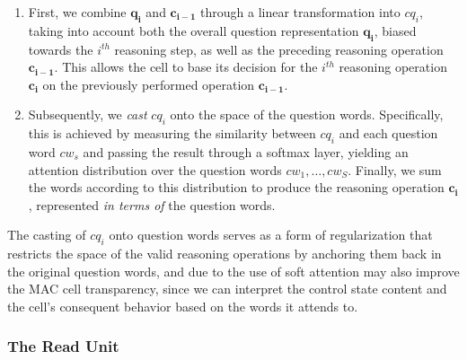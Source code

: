 \documentclass[fleqn]{article}
\begin{document}
\begin{enumerate}
  
\item First, we combine \(\boldsymbol{q_i}\) and  \(\boldsymbol{c_{i-1}}\) through a linear transformation into \({{cq}_i}\), taking into account both the overall question representation \(\boldsymbol{q_i}\), biased towards the \(i^{th}\) reasoning step, as well as the preceding reasoning operation \(\boldsymbol{c_{i-1}}\). This allows the cell to base its decision for the \(i^{th}\) reasoning operation \(\boldsymbol{c_i}\) on the previously performed operation \(\boldsymbol{c_{i-1}}\).
\item Subsequently, we \textit{cast} \({\mathit{cq}_i}\) onto the space of the question words. Specifically, this is achieved by measuring the similarity between \({{cq}_i}\) and each question word \({\boldsymbol{\mathit{cw}}_s}\) and passing the result through a softmax layer, yielding an attention distribution over the question words \({\boldsymbol{\mathit{cw}}_1,\ldots,\boldsymbol{\mathit{cw}}_S}\). Finally, we sum the words according to this distribution to produce the reasoning operation \(\boldsymbol{c_i}\), represented \textit{in terms of} the question words. 
\end{enumerate}  
The casting of \({\mathit{cq}_i}\) onto question words serves as a form of regularization that restricts the space of the valid reasoning operations by anchoring them back in the original question words, and due to the use of soft attention may also improve the MAC cell transparency, since we can interpret the control state content and the cell's consequent behavior based on the words it attends to.

\subsubsection{The Read Unit}
\label{sec:RU}
\end{document}
